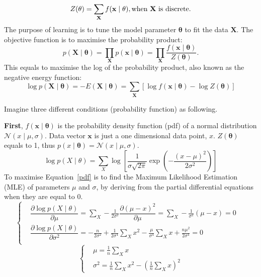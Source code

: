 \documentclass[11pt,twoside,a4paper]{article}
\begin{document}
\begin{equation}
Z( \mathbf{\theta}) = \sum_\mathbf{X} f(\mathbf{x} \mid \mathbf{\theta} ), \text{when  $ \mathbf{X} $ is discrete.}
\end{equation}
The purpose of learning is to tune the model parameter $ \mathbf{\theta} $ to fit the data $ \mathbf{X}  $. 
The objective function is to maximise the probability product:
\begin{equation}
 p(\mathbf{X} \mid \mathbf{\theta} ) = \prod_\mathbf{X} p(\mathbf{x} \mid \mathbf{\theta} ) =  \prod_\mathbf{X}\dfrac{f(\mathbf{x} \mid \mathbf{\theta} )}{Z( \mathbf{\theta})}.
\end{equation}
 This equals to maximise the log of the probability product, also known as the negative energy function:
\begin{equation}
  \log p(\mathbf{X} \mid \mathbf{\theta} ) = -E(\mathbf{X} \mid \mathbf{\theta} )  =  \sum_\mathbf{X}[\log f(\mathbf{x} \mid \mathbf{\theta} ) - \log Z( \mathbf{\theta})] 
\end{equation}

Imagine three different conditions (probability function) as following.

\textbf{First}, $f(\mathbf{x} \mid \mathbf{\theta} )$ is the probability density function (pdf) of a normal distribution $\mathcal{N}(x \mid \mu, \sigma )$.
Data vector $ \mathbf{x} $ is just a one dimensional data point, $x$.
$ Z( \mathbf{\theta}) $ equals to 1, thus $p(x \mid \mathbf{\theta} ) = \mathcal{N}(x \mid \mu, \sigma )$.
\begin{equation}
\log p(X \mid \theta ) =  \sum_X \log [\frac{1}{\sigma \sqrt{2\pi}} \exp(-\frac{(x-\mu)^{2}}{2\sigma^{2}})]
\label{pdf}
\end{equation}
To maximise Equation~\ref{pdf} is to find the Maximum Likelihood Estimation (MLE) of parameters $ \mu $ and $ \sigma $, by deriving from the partial differential equations when they are equal to 0. 
\begin{equation}
\left\{
\begin{aligned}
   &\dfrac{\partial  \log p(X \mid \theta ) }{\partial \mu}= \sum_X -\frac{1}{2\sigma^{2}}\dfrac{\partial (\mu-x)^{2}}{\partial \mu} = \sum_X -\frac{1}{\sigma^{2}}(\mu-x) = 0 \quad\\
   &\dfrac{\partial  \log p(X \mid \theta ) }{\partial \sigma^{2}}= -\frac{n}{2\sigma^{2}}+\frac{1}{2\sigma^{4}}\sum_X x^{2} -\frac{\mu}{\sigma^{4}}\sum_X x + \frac{n\mu^{2}}{2\sigma^{4}} = 0 \quad\\
\end{aligned}
\right.
\end{equation}
\begin{equation}
\left\{
\begin{aligned}
    &\mu= \frac{1}{n}\sum_X x  \quad\\
    &\sigma^{2} = \frac{1}{n}\sum_X x^{2} - (\frac{1}{n}\sum_X x)^{2}
\end{aligned}
\right.
\end{equation}
\end{document}
